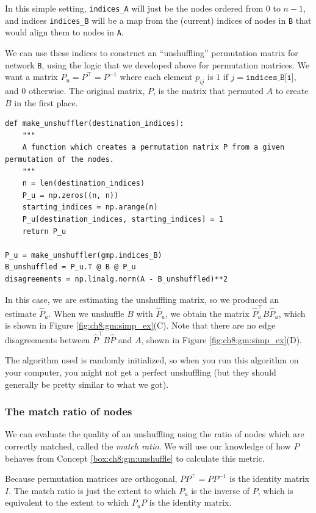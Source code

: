 In this simple setting, \texttt{indices\_A} will just be the nodes ordered from $0$ to $n-1$, and indices \texttt{indices\_B} will be a map from the (current) indices of nodes in \texttt{B} that would align them to nodes in \texttt{A}.

We can use these indices to construct an ``unshuffling'' permutation matrix for network \texttt{B}, using the logic that we developed above for permutation matrices. We want a matrix $P_u = P^\top = P^{-1}$ where each element $p_{ij}$ is $1$ if $j = \texttt{indices\_B[i]}$, and $0$ otherwise. The original matrix, $P$, is the matrix that permuted $A$ to create $B$ in the first place.

\begin{lstlisting}[style=python]
def make_unshuffler(destination_indices):
    """
    A function which creates a permutation matrix P from a given permutation of the nodes.
    """
    n = len(destination_indices)
    P_u = np.zeros((n, n))
    starting_indices = np.arange(n)
    P_u[destination_indices, starting_indices] = 1
    return P_u

P_u = make_unshuffler(gmp.indices_B)
B_unshuffled = P_u.T @ B @ P_u
disagreements = np.linalg.norm(A - B_unshuffled)**2
\end{lstlisting}

In this case, we are estimating the unshuffling  matrix, so we produced an estimate $\hat P_u$. When we unshuffle $B$ with $\hat P_u$, we obtain the matrix $\hat P_u^\top B \hat P_u$, which is shown in Figure \ref{fig:ch8:gm:simp_ex}(C). Note that there are no edge disagreements between $\hat P^\top B \hat P$ and $A$, shown in Figure \ref{fig:ch8:gm:simp_ex}(D). 

The algorithm used is randomly initialized, so when you run this algorithm on your computer, you might not get a perfect unshuffling (but they should generally be pretty similar to what we got). 

\subsubsection*{The match ratio of nodes}

We can evaluate the quality of an unshuffling using the ratio of nodes which are correctly matched, called the \textit{match ratio}. We will use our knowledge of how $P$ behaves from Concept \ref{box:ch8:gm:unshuffle} to calculate this metric.

Because permutation matrices are orthogonal, $PP^\top = PP^{-1}$ is the identity matrix $I$. The match ratio is just the extent to which $P_u$ is the inverse of $P$, which is equivalent to the extent to which $P_u P$ is the identity matrix.


